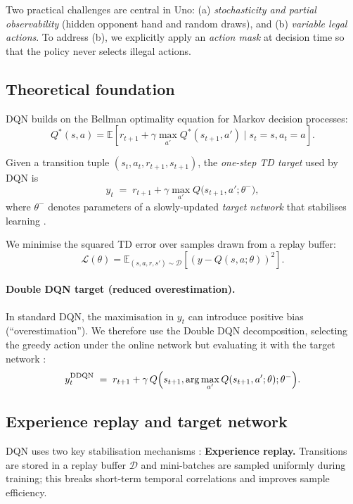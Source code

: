 \documentclass[11pt]{article}
\begin{document}
Two practical challenges are central in Uno: (a) \emph{stochasticity and partial observability} (hidden opponent hand and random draws), and (b) \emph{variable legal actions}. To address (b), we explicitly apply an \emph{action mask} at decision time so that the policy never selects illegal actions.

\subsection{Theoretical foundation}
DQN builds on the Bellman optimality equation for Markov decision processes:
\begin{equation}
Q^*(s,a)=\mathbb{E}\left[r_{t+1}+\gamma \max_{a'} Q^*(s_{t+1},a')\mid s_t=s, a_t=a\right].
\end{equation}

Given a transition tuple $(s_t,a_t,r_{t+1},s_{t+1})$, the \emph{one-step TD target} used by DQN is
\begin{equation}
  y_t \;=\; r_{t+1} + \gamma\max_{a'} Q\bigl(s_{t+1},a';\theta^{-}\bigr),
\end{equation}
where $\theta^{-}$ denotes parameters of a slowly-updated \emph{target network} that stabilises learning \parencite{mnih2015human}.

We minimise the squared TD error over samples drawn from a replay buffer:
\begin{equation}
\mathcal{L}(\theta)=\mathbb{E}_{(s,a,r,s')\sim\mathcal{D}}\left[\left(y - Q(s,a;\theta)\right)^2\right].
\end{equation}

\paragraph{Double DQN target (reduced overestimation).}
In standard DQN, the maximisation in $y_t$ can introduce positive bias (``overestimation''). We therefore use the Double DQN decomposition, selecting the greedy action under the online network but evaluating it with the target network \parencite{vanhasselt2016double}:
\begin{equation}
  y_t^{\mathrm{DDQN}} \;=\; r_{t+1} + \gamma\,Q\Bigl(s_{t+1},\arg\max_{a'}Q(s_{t+1},a';\theta);\theta^{-}\Bigr).
\end{equation}

\subsection{Experience replay and target network}
DQN uses two key stabilisation mechanisms \parencite{mnih2015human}:
\textbf{Experience replay.} Transitions are stored in a replay buffer $\mathcal{D}$ and mini-batches are sampled uniformly during training; this breaks short-term temporal correlations and improves sample efficiency.
\end{document}
